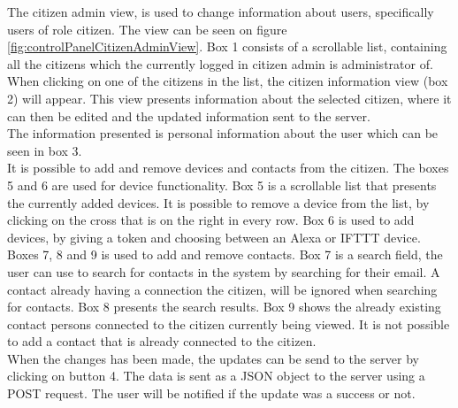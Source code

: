 The citizen admin view, is used to change information about users, specifically users of role citizen. The view can be seen on figure \ref{fig:controlPanelCitizenAdminView}. Box 1 consists of a scrollable list, containing all the citizens which the currently logged in citizen admin is administrator of.
When clicking on one of the citizens in the list, the citizen information view (box 2) will appear. This view presents information about the selected citizen, where it can then be edited and the updated information sent to the server.\\
The information presented is personal information about the user which can be seen in box 3.\\
It is possible to add and remove devices and contacts from the citizen. The boxes 5 and 6 are used for device functionality. Box 5 is a scrollable list that presents the currently added devices. It is possible to remove a device from the list, by clicking on the cross that is on the right in every row. Box 6 is used to add devices, by giving a token and choosing between an Alexa or IFTTT device.\\
Boxes 7, 8 and 9 is used to add and remove contacts. Box 7 is a search field, the user can use to search for contacts in the system by searching for their email. A contact already having a connection the citizen, will be ignored when searching for contacts. Box 8 presents the search results. Box 9 shows the already existing contact persons connected to the citizen currently being viewed. It is not possible to add a contact that is already connected to the citizen.\\
When the changes has been made, the updates can be send to the server by clicking on button 4. The data is sent as a JSON object to the server using a POST request. The user will be notified if the update was a success or not.
